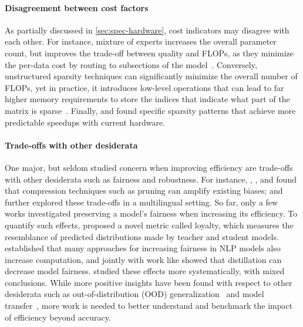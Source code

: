\paragraph{Disagreement between cost factors} As partially discussed in \ref{sec:spec-hardware}, cost indicators may disagree with each other. For instance, mixture of experts increases the overall parameter count, but improves the trade-off between quality and FLOPs, as they minimize the per-data cost by routing to subsections of the model~\citep{Rajbhandari2022}. Conversely, unstructured sparsity techniques can significantly minimize the overall number of FLOPs, yet in practice, it introduces low-level operations that can lead to far higher memory requirements to store the indices that indicate what part of the matrix is sparse~\citep{qu_dota_2022}. Finally, \citet{dao2021} and \citet{dao2022monarch} found specific sparsity patterns that achieve more predictable speedups with current hardware.

\paragraph{Trade-offs with other desiderata} One major, but seldom studied concern when improving efficiency are trade-offs with other desiderata such as fairness and robustness. For instance, \citet{Hooker2020}, \citet{renduchintala-etal-2021-gender}, and \citet{silva-etal-2021-towards} found that compression techniques such as pruning can amplify existing biases; \citet{Mohammadshahi2022} and \citet{ogueji-etal-2022-intriguing} further explored these trade-offs in a multilingual setting. So far, only a few works investigated preserving a model's fairness when increasing its efficiency. To quantify such effects, \citet{xu-etal-2021-beyond} proposed a novel metric called loyalty, which measures the resemblance of predicted distributions made by teacher and student models. \citet{hessenthaler-etal-2022-bridging} established that many approaches for increasing fairness in NLP models also increase computation, and jointly with work like \citet{wang2022} showed that distillation can decrease model fairness.
\citet{xu2022can} studied these effects more systematically, with mixed conclusions. While more positive insights have been found with respect to other desiderata such as out-of-distribution (OOD) generalization~\citep{ahia-etal-2021-low-resource,iofinova2021well,ogueji-etal-2022-intriguing} and model transfer~\citep{gordon_compressing_2020}, more work is needed to better understand and benchmark the impact of efficiency beyond accuracy.

